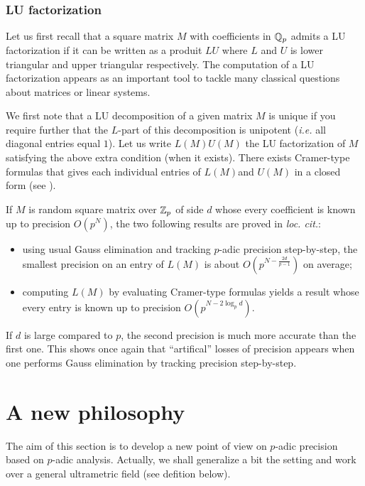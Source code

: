 \documentclass{amsart}
\begin{document}
\subsubsection*{LU factorization}

Let us first recall that a square matrix $M$ with coefficients in $\mathbb Q_p$ 
admits a LU factorization if it can be written as a produit $LU$ where 
$L$ and $U$ is lower triangular and upper triangular respectively. 
The computation of a LU factorization appears as an important tool to 
tackle many classical questions about matrices or linear systems.

We first note that a LU decomposition of a given matrix $M$ is unique
if you require further that the $L$-part of this decomposition is
unipotent (\emph{i.e.} all diagonal entries equal $1$). Let us write
$L(M) U(M)$ the LU factorization of $M$ satisfying the above extra
condition (when it exists). There exists Cramer-type formulas that
gives each individual entries of $L(M)$and $U(M)$ in a closed form
(see \cite{Caruso}).

If $M$ is random square matrix over $\mathbb Z_p$ of side $d$ whose every
coefficient is known up to precision $O(p^N)$, the two following
results are proved in \emph{loc. cit.}:
\begin{itemize}
\item using usual Gauss elimination and tracking $p$-adic precision 
step-by-step, the smallest precision on an entry of $L(M)$ is about
$O(p^{N - \frac{2d}{p-1}})$ on average;
\item computing $L(M)$ by evaluating Cramer-type formulas yields a
result whose every entry is known up to precision $O(p^{N - 2 \log_p 
d})$.
\end{itemize}
If $d$ is large compared to $p$, the second precision is much more
accurate than the first one. This shows once again that ``artifical''
losses of precision appears when one performs Gauss elimination by
tracking precision step-by-step.


\section{A new philosophy}
\label{sec:philosophy}

The aim of this section is to develop a new point of view on $p$-adic 
precision based on $p$-adic analysis. Actually, we shall generalize a 
bit the setting and work over a general ultrametric field (see defition
below).
\end{document}
